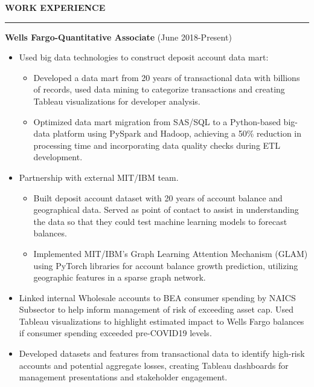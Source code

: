 \documentclass[a4paper,10pt]{article}
\begin{document}
\noindent
\textbf{WORK EXPERIENCE}\vspace{-3mm}\\
\hrule height 2pt
\vspace{2mm}
\textbf{Wells Fargo-Quantitative Associate} (June 2018-Present)
\begin{itemize}
\item Used big data technologies to construct deposit account data mart:
  \begin{itemize}[label=\textbullet]
  \item Developed a data mart from 20 years of transactional data with billions of records, used data mining to categorize transactions and creating Tableau visualizations for developer analysis.
  \end{itemize}
 \begin{itemize}[label=\textbullet]
  \item Optimized data mart migration from SAS/SQL to a Python-based big-data platform using PySpark and Hadoop, achieving a 50\% reduction in processing time and incorporating data quality checks during ETL development.
  \end{itemize}
\item Partnership with external MIT/IBM team.
 \begin{itemize}[label=\textbullet]
  \item Built deposit account dataset with 20 years of account balance and geographical data. Served as point of contact to assist in understanding the data so that they could test machine learning models to forecast balances.
  \end{itemize}
 \begin{itemize}[label=\textbullet]
  \item Implemented MIT/IBM's Graph Learning Attention Mechanism (GLAM) using PyTorch libraries for account balance growth prediction, utilizing geographic features in a sparse graph network.
  \end{itemize}
\item Linked internal Wholesale accounts to BEA consumer spending by NAICS Subsector to help inform management of risk of exceeding asset cap. Used Tableau visualizations to highlight estimated impact to Wells Fargo balances if consumer spending exceeded pre-COVID19 levels.
\item Developed datasets and features from transactional data to identify high-risk accounts and potential aggregate losses, creating Tableau dashboards for management presentations and stakeholder engagement.
\end{itemize}
\end{document}
